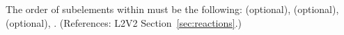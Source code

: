 The order of subelements within \Reaction must be the following:
 (optional),  (optional),
 (optional), .
(References: L2V2 Section~\ref{sec:reactions}.)

